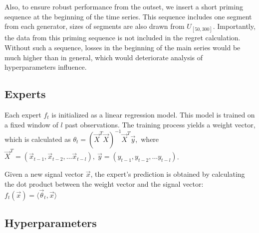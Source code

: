 \documentclass[12pt, twoside]{article}
\begin{document}
Also, to ensure robust performance from the outset, we insert a short priming sequence at the beginning of the time series. 
This sequence includes one segment from each generator, sizes of segments are also drawn from  $U_{[50, 300]}$.
 Importantly, the data from this priming sequence is not included in the regret calculation. 
 Without such a sequence, losses in the beginning of the main series would be much higher than in general, which would deteriorate analysis of hyperparameters influence.
\subsection{Experts}

Each expert $f_t$ is initialized as a linear regression model. 
This model is trained on a fixed window of $l$ past observations. 
The training process yields a weight vector, which is calculated as  
$\theta_t = (\vec X^T\vec X)^{-1}\vec X^T\vec y$,\ where $\vec X^T = (\vec x_{t-1}, \vec x_{t-2}, \dots \vec x_{t-l}),\ \vec y = (y_{t-1}, y_{t-2}, \dots y_{t-l})$. 

Given a new signal vector  $\vec x$, the expert's prediction is obtained by calculating the dot product between the weight vector and the signal vector: $f_t(\vec x) = \langle \vec \theta_t, \vec x \rangle$ 

\subsection{Hyperparameters}
\end{document}
